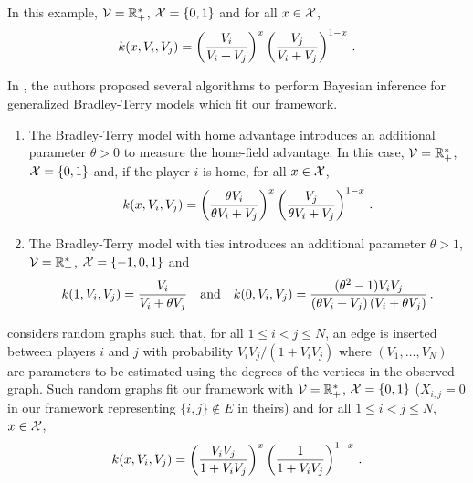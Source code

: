 \begin{Example}
In this example, $\mathcal{V}=\mathbb{R}_+^*$, $\mathcal{X}=\{0,1\}$ and for all $x\in\mathcal{X}$,
\[
k(x,V_i,V_j) = \left(\frac{V_i}{V_i+V_j}\right)^x\left(\frac{V_j}{V_i+V_j}\right)^{1-x}\,.
\]
\end{Example}
\begin{Example}
In \cite{caron:doucet:2012}, the authors proposed several algorithms to perform Bayesian inference for generalized Bradley-Terry models which fit our framework.
\begin{enumerate}[-]
\item The Bradley-Terry model with home advantage introduces an additional parameter $\theta>0$ to measure the home-field advantage. In this case, $\mathcal{V}=\mathbb{R}_+^*$, $\mathcal{X}=\{0,1\}$ and, if the player $i$ is home, for all $x\in\mathcal{X}$,
\[
k(x,V_i,V_j)= \left(\frac{\theta V_i}{\theta V_i+V_j}\right)^x\left(\frac{V_j}{\theta V_i+V_j}\right)^{1-x}\,.
\]
\item The Bradley-Terry model with ties \cite{rao:kupper:1967} introduces an additional parameter $\theta>1$, $\mathcal{V}=\mathbb{R}_+^*$, $\mathcal{X}=\{-1,0,1\}$ and
\[
k(1,V_i,V_j)= \frac{V_i}{V_i+ \theta V_j}\quad\mbox{and}\quad k(0,V_i,V_j)= \frac{(\theta^2-1) V_i V_j}{\left(\theta V_i+V_j\right)\left( V_i+\theta V_j\right)}\,.
\]
\end{enumerate}
\end{Example}
\begin{Example}
\cite{chatterjee:diaconis:sly:2011} considers random graphs such that, for all $1\le i <j\le N$, an edge is inserted between players $i$ and $j$ with probability $V_iV_j/(1+V_iV_j)$ where $(V_1,\ldots,V_N)$ are parameters to be estimated using the degrees of the vertices in the observed graph. Such random graphs fit our framework with $\mathcal{V}=\mathbb{R}_+^*$, $\mathcal{X}=\{0,1\}$ ($X_{i,j}=0$ in our framework representing $\{i,j\}\notin E$ in theirs) and for all $1\le i <j\le N$, $x\in\mathcal{X}$,
\[
k(x,V_i,V_j) = \left(\frac{V_iV_j}{1+V_iV_j}\right)^x\left(\frac{1}{1+V_iV_j}\right)^{1-x}\,.
\]
\end{Example}
